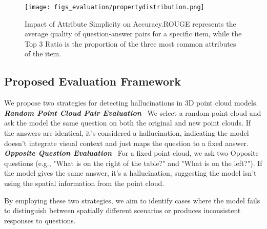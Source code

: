 \begin{figure*}[h]
\begin{center}
\centering
    \texttt{[image: figs\_evaluation/propertydistribution.png]}
     \caption{Impact of Attribute Simplicity on Accuracy.ROUGE represents the average quality of question-answer pairs for a specific item, while the Top 3 Ratio is the proportion of the three most common attributes of the item.}
     \label{fig:topkRatio}
\end{center}
\end{figure*}
\subsection{Proposed Evaluation Framework}
We propose two strategies for detecting hallucinations in 3D point cloud models.\\
\textbf{\emph{Random Point Cloud Pair Evaluation}} ~We select a random point cloud and ask the model the same question on both the original and new point clouds. If the answers are identical, it's considered a hallucination, indicating the model doesn't integrate visual context and just maps the question to a fixed answer.\\
\textbf{\emph{Opposite Question Evaluation}} ~For a fixed point cloud, we ask two Opposite questions (e.g., "What is on the right of the table?" and "What is on the left?"). If the model gives the same answer, it's a hallucination, suggesting the model isn't using the spatial information from the point cloud.

 By employing these two strategies, we aim to identify cases where the model fails to distinguish between spatially different scenarios or produces inconsistent responses to questions.
